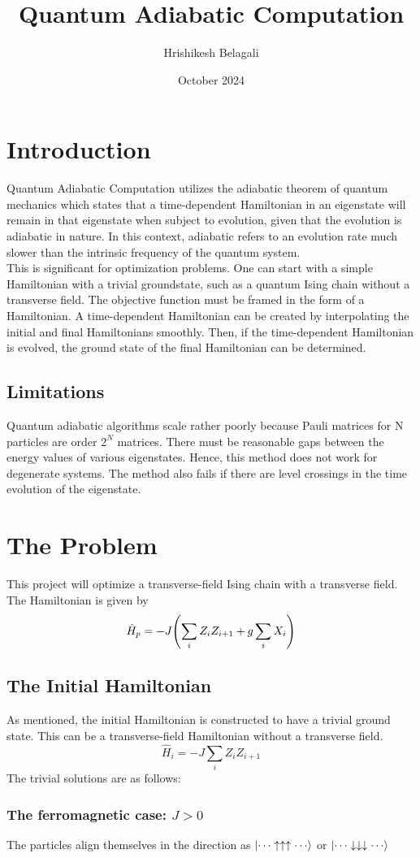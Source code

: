 \documentclass{article}
\title{Quantum Adiabatic Computation}
\author{Hrishikesh Belagali}
\date{October 2024}
\begin{document}
 
\maketitle
\section{Introduction}
Quantum Adiabatic Computation utilizes the adiabatic theorem of quantum 
mechanics which states that a time-dependent Hamiltonian in an eigenstate will remain 
in that eigenstate when subject to evolution, given that the evolution is adiabatic in nature. 
In this context, adiabatic refers to an evolution rate much slower than the intrinsic frequency of the 
quantum system. \\
This is significant for optimization problems. One can start with a simple Hamiltonian with a trivial groundstate, such as a quantum Ising chain without a transverse field. 
The objective function must be framed in the form of a Hamiltonian. A time-dependent Hamiltonian can be created by interpolating the initial and final Hamiltonians smoothly. 
Then, if the time-dependent Hamiltonian is evolved, the ground state of the final Hamiltonian can be determined. 
\subsection{Limitations}
Quantum adiabatic algorithms scale rather poorly because Pauli matrices for N particles are order $2^N$ matrices. There must be reasonable gaps between the energy values of various eigenstates. 
Hence, this method does not work for degenerate systems. The method also fails if there are level crossings in the time evolution of the eigenstate. 
\section{The Problem}
This project will optimize a transverse-field Ising chain with a transverse field. The Hamiltonian is given by 
$$\hat H_p = -J\pqty{\sum_{i}Z_iZ_{i+1} + g\sum_{i}X_i}$$
\subsection{The Initial Hamiltonian}
As mentioned, the initial Hamiltonian is constructed to have a trivial ground state. This can be a transverse-field Hamiltonian without a transverse field. 
$$\hat H_i = -J\sum_{i}{Z_iZ_{i+1}}$$ 
The trivial solutions are as follows: 
\subsubsection{The ferromagnetic case: $J>0$}
The particles align themselves in the direction as $\ket{\cdots \uparrow\uparrow\uparrow \cdots}$ or $\ket{\cdots \downarrow\downarrow\downarrow \cdots}$
\end{document}
